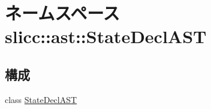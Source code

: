 \hypertarget{namespaceslicc_1_1ast_1_1StateDeclAST}{
\section{ネームスペース slicc::ast::StateDeclAST}
\label{namespaceslicc_1_1ast_1_1StateDeclAST}
}
\subsection*{構成}
\begin{DoxyCompactItemize}
\item 
class \hyperlink{classslicc_1_1ast_1_1StateDeclAST_1_1StateDeclAST}{StateDeclAST}
\end{DoxyCompactItemize}
